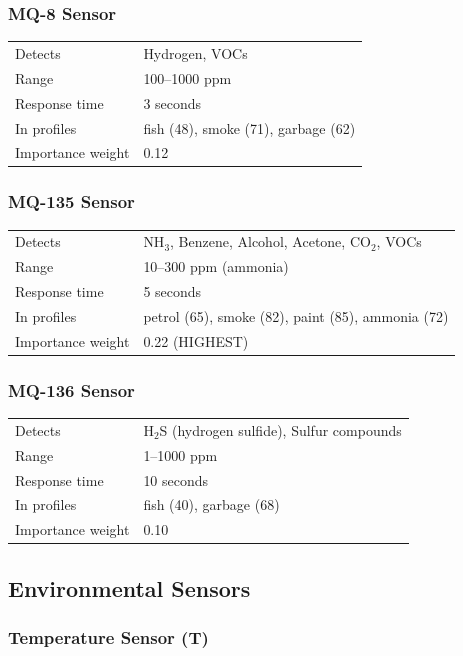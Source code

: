 \documentclass[12pt,a4paper]{article}
\begin{document}
\subsubsection{MQ-8 Sensor}

\begin{tabular}{ll}
Detects & Hydrogen, VOCs \\
Range & 100–1000 ppm \\
Response time & 3 seconds \\
In profiles & fish (48), smoke (71), garbage (62) \\
Importance weight & 0.12 \\
\end{tabular}

\subsubsection{MQ-135 Sensor}

\begin{tabular}{ll}
Detects & NH$_3$, Benzene, Alcohol, Acetone, CO$_2$, VOCs \\
Range & 10–300 ppm (ammonia) \\
Response time & 5 seconds \\
In profiles & petrol (65), smoke (82), paint (85), ammonia (72) \\
Importance weight & 0.22 (HIGHEST) \\
\end{tabular}

\subsubsection{MQ-136 Sensor}

\begin{tabular}{ll}
Detects & H$_2$S (hydrogen sulfide), Sulfur compounds \\
Range & 1–1000 ppm \\
Response time & 10 seconds \\
In profiles & fish (40), garbage (68) \\
Importance weight & 0.10 \\
\end{tabular}

\subsection{Environmental Sensors}

\subsubsection{Temperature Sensor (T)}
\end{document}
